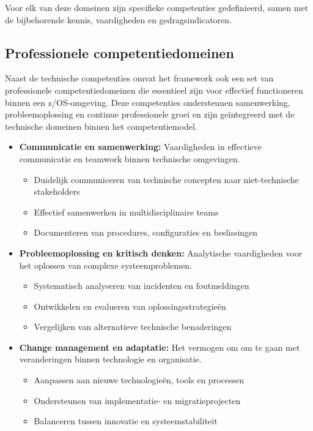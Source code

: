 Voor elk van deze domeinen zijn specifieke competenties gedefinieerd, samen met de bijbehorende kennis, vaardigheden en gedragsindicatoren.

\subsection{Professionele competentiedomeinen}

Naast de technische competenties omvat het framework ook een set van professionele competentiedomeinen die essentieel zijn voor effectief functioneren binnen een z/OS-omgeving. Deze competenties ondersteunen samenwerking, probleemoplossing en continue professionele groei en zijn geïntegreerd met de technische domeinen binnen het competentiemodel.

\begin{itemize}
	
	\item \textbf{Communicatie en samenwerking:} Vaardigheden in effectieve communicatie en teamwork binnen technische omgevingen.
	\begin{itemize}
		\item Duidelijk communiceren van technische concepten naar niet-technische stakeholders
		\item Effectief samenwerken in multidisciplinaire teams
		\item Documenteren van procedures, configuraties en beslissingen
	\end{itemize}
	
	\item \textbf{Probleemoplossing en kritisch denken:} Analytische vaardigheden voor het oplossen van complexe systeemproblemen.
	\begin{itemize}
		\item Systematisch analyseren van incidenten en foutmeldingen
		\item Ontwikkelen en evalueren van oplossingsstrategieën
		\item Vergelijken van alternatieve technische benaderingen
	\end{itemize}
	
	\item \textbf{Change management en adaptatie:} Het vermogen om om te gaan met veranderingen binnen technologie en organisatie.
	\begin{itemize}
		\item Aanpassen aan nieuwe technologieën, tools en processen
		\item Ondersteunen van implementatie- en migratieprojecten
		\item Balanceren tussen innovatie en systeemstabiliteit
	\end{itemize}
	

\end{itemize}
